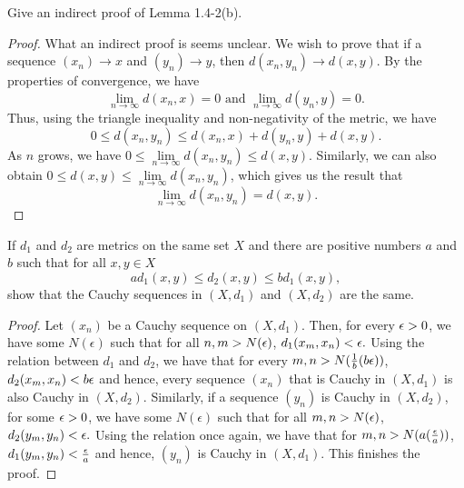  \begin{question}
     Give an indirect proof of Lemma 1.4-2(b).
     \label{section1.4-7}
 \end{question}
 \begin{proof}
    What an indirect proof is seems unclear. We wish to prove that if a sequence $(x_n) \rightarrow x$ and $(y_n) \rightarrow y$, then $d(x_n,y_n) \rightarrow d(x,y)$. By the properties of convergence, we have
    \[\lim\limits_{n \rightarrow \infty} d(x_n,x) = 0 \text{ and } \lim\limits_{n \rightarrow \infty} d(y_n,y) = 0.\]
    Thus, using the triangle inequality and non-negativity of the metric, we have
    \[0 \leq d(x_n,y_n) \leq d(x_n,x) + d(y_n,y) + d(x,y).\]
    As $n$ grows, we have $0 \leq \lim\limits_{n \rightarrow \infty} d(x_n,y_n) \leq d(x,y)$. Similarly, we can also obtain $0 \leq d(x,y) \leq \lim\limits_{n \rightarrow \infty} d(x_n,y_n)$, which gives us the result that
    \[\lim\limits_{n \rightarrow \infty} d(x_n,y_n) = d(x,y).\]
 \end{proof}

 \begin{question}
     If $d_1$ and $d_2$ are metrics on the same set $X$ and there are positive numbers $a$ and $b$ such that for all $x , y \in X$
     \[ad_1(x,y) \leq d_2(x,y) \leq bd_1(x,y),\]
     show that the Cauchy sequences in $(X,d_1)$ and $(X,d_2)$ are the same.
     \label{section1.4-8}
 \end{question}
 \begin{proof}
     Let $(x_n)$ be a Cauchy sequence on $(X,d_1)$. Then, for every $\epsilon > 0$, we have some $N(\epsilon)$ such that for all $n,m > N(\epsilon)$, $d_1(x_m,x_n) < \epsilon.$ Using the relation between $d_1$ and $d_2$, we have that for every $m,n > N(\frac{1}{b} (b\epsilon))$, $d_2(x_m , x_n) < b\epsilon$ and hence, every sequence $(x_n)$ that is Cauchy in $(X,d_1)$ is also Cauchy in $(X,d_2)$. Similarly, if a sequence $(y_n)$ is Cauchy in $(X,d_2)$, for some $\epsilon > 0$, we have some $N(\epsilon)$ such that for all $m,n > N(\epsilon)$, $d_2(y_m,y_n) < \epsilon.$ Using the relation once again, we have that for $m,n > N(a(\frac{\epsilon}{a}))$, $d_1(y_m , y_n) < \frac{\epsilon}{a}$ and hence, $(y_n)$ is Cauchy in $(X,d_1)$. This finishes the proof.
 \end{proof}

